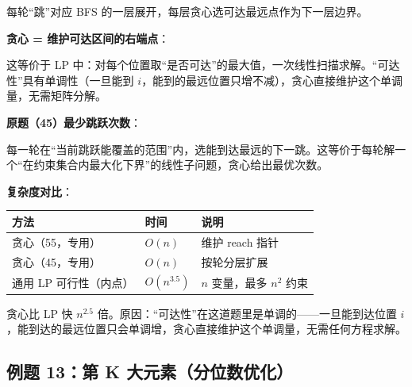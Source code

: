 \documentclass[12pt, a4paper]{ctexart}
\begin{document}
\begin{blackboard}
每轮``跳''对应 BFS 的一层展开，每层贪心选可达最远点作为下一层边界。

\textbf{贪心 = 维护可达区间的右端点}：

这等价于 LP 中：对每个位置取``是否可达''的最大值，一次线性扫描求解。``可达性''具有单调性（一旦能到 $i$，能到的最远位置只增不减），贪心直接维护这个单调量，无需矩阵分解。

\textbf{原题（45）最少跳跃次数}：

每一轮在``当前跳跃能覆盖的范围''内，选能到达最远的下一跳。这等价于每轮解一个``在约束集合内最大化下界''的线性子问题，贪心给出最优次数。

\textbf{复杂度对比}：

\begin{center}
\begin{tabular}{lll}
\toprule
方法 & 时间 & 说明 \\
\midrule
贪心（55，专用） & $O(n)$ & 维护 reach 指针 \\
贪心（45，专用） & $O(n)$ & 按轮分层扩展 \\
通用 LP 可行性（内点） & $O(n^{3.5})$ & $n$ 变量，最多 $n^2$ 约束 \\
\bottomrule
\end{tabular}
\end{center}

贪心比 LP 快 $n^{2.5}$ 倍。原因：``可达性''在这道题里是单调的——一旦能到达位置 $i$，能到达的最远位置只会单调增，贪心直接维护这个单调量，无需任何方程求解。

\end{blackboard}

\subsection{例题 13：第 K 大元素（分位数优化）}
\end{document}
